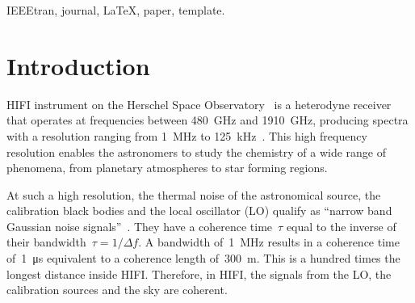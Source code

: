 \documentclass[journal]{IEEEtran}
\begin{document}
\begin{IEEEkeywords}
IEEEtran, journal, \LaTeX, paper, template.
\end{IEEEkeywords}






%
\IEEEpeerreviewmaketitle



\section{Introduction}
% 
% 
% 
% 
 HIFI instrument on the Herschel Space Observatory~\cite{AA_518_L1} is a heterodyne receiver that operates at frequencies between \SI{480}{\giga\hertz} and \SI{1910}{\giga\hertz},
producing spectra with a resolution ranging from \SI{1}{\mega\hertz} to \SI{125}{\kilo\hertz}~\cite{AA_518_L6}.
This high frequency resolution enables the astronomers to study the chemistry of a wide range of phenomena, from planetary atmospheres to star forming regions.

At such a high resolution, the thermal noise of the astronomical source, the calibration black bodies and the local oscillator (LO) qualify as ``narrow band Gaussian noise signals''~\cite{siegman1986lasers}.
They have a coherence time~$\tau$ equal to the inverse of their bandwidth~$\tau=1/\Delta f$.
A bandwidth of~\SI{1}{\mega\hertz} results in a coherence time of~\SI{1}{\micro\second} equivalent to a coherence length of~\SI{300}{\meter}.
This is a hundred times the longest distance inside HIFI.
Therefore, in HIFI, the signals from the LO, the calibration sources and the sky are coherent.
\end{document}
